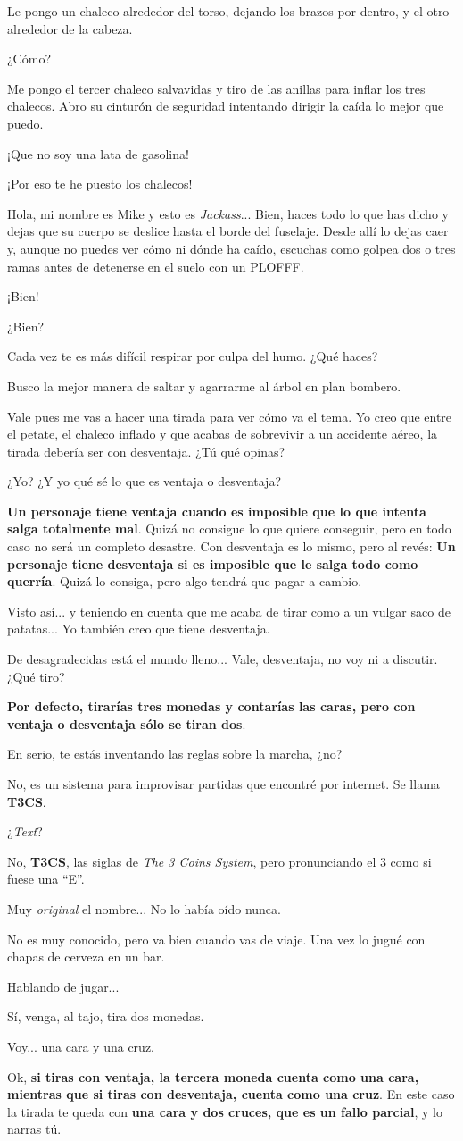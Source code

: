 \documentclass[10pt, a5paper, twocolumn]{article}
\newenvironment{dialogue}
    {\begin{description}[leftmargin=!,align=right,labelwidth=0.cm]}
    {\end{description}}
\newcommand\A{\item[\raisebox{-0.25em}{\scalebox{0.75}{\bctetraedre}}]}
\newcommand\B{\item[\raisebox{-0.25em}{\scalebox{0.75}{\bccube}}]}
\newcommand\E{\item[\raisebox{-0.25em}{\scalebox{0.75}{\bcicosaedre}}]}
\begin{document}
\begin{dialogue}
        \B Le pongo un chaleco alrededor del torso, dejando los brazos por dentro, y el otro alrededor de la cabeza.
        \A ¿Cómo?
        \B Me pongo el tercer chaleco salvavidas y tiro de las anillas para inflar los tres chalecos. Abro su cinturón de seguridad intentando dirigir la caída lo mejor que puedo.
        \A ¡Que no soy una lata de gasolina!
        \B ¡Por eso te he puesto los chalecos!
        \E Hola, mi nombre es Mike y esto es \emph{Jackass}... Bien, haces todo lo que has dicho y dejas que su cuerpo se deslice hasta el borde del fuselaje. Desde allí lo dejas caer y, aunque no puedes ver cómo ni dónde ha caído, escuchas como golpea dos o tres ramas antes de detenerse en el suelo con un PLOFFF.
        \B ¡Bien!
        \A ¿Bien?
        \E Cada vez te es más difícil respirar por culpa del humo. ¿Qué haces?
        \B Busco la mejor manera de saltar y agarrarme al árbol en plan bombero.
        \E Vale pues me vas a hacer una tirada para ver cómo va el tema. Yo creo que entre el petate, el chaleco inflado y que acabas de sobrevivir a un accidente aéreo, la tirada debería ser con desventaja. ¿Tú qué opinas?
        \A ¿Yo? ¿Y yo qué sé lo que es ventaja o desventaja?
        \E \textbf{Un personaje tiene ventaja cuando es imposible que lo que intenta salga totalmente mal}. Quizá no consigue lo que quiere conseguir, pero en todo caso no será un completo desastre. Con desventaja es lo mismo, pero al revés: \textbf{Un personaje tiene desventaja si es imposible que le salga todo como querría}. Quizá lo consiga, pero algo tendrá que pagar a cambio.
        \A Visto así... y teniendo en cuenta que me acaba de tirar como a un vulgar saco de patatas... Yo también creo que tiene desventaja.
        \B De desagradecidas está el mundo lleno... Vale, desventaja, no voy ni a discutir. ¿Qué tiro?
        \E \textbf{Por defecto, tirarías tres monedas y contarías las caras, pero con ventaja o desventaja sólo se tiran dos}.
        \B En serio, te estás inventando las reglas sobre la marcha, ¿no?
        \E No, es un sistema para improvisar partidas que encontré por internet. Se llama \textbf{T3CS}.
        \B ¿\emph{Text}?
        \E No, \textbf{T3CS}, las siglas de \emph{The 3 Coins System}, pero pronunciando el 3 como si fuese una ``E''.
        \B Muy \emph{original} el nombre... No lo había oído nunca.
        \E No es muy conocido, pero va bien cuando vas de viaje. Una vez lo jugué con chapas de cerveza en un bar.
        \A Hablando de jugar...
        \E Sí, venga, al tajo, tira dos monedas.
        \B Voy... una cara y una cruz.
        \E Ok, \textbf{si tiras con ventaja, la tercera moneda cuenta como una cara, mientras que si tiras con desventaja, cuenta como una cruz}. En este caso la tirada te queda con \textbf{una cara y dos cruces, que es un fallo parcial}, y lo narras tú.

\end{dialogue}
\end{document}
